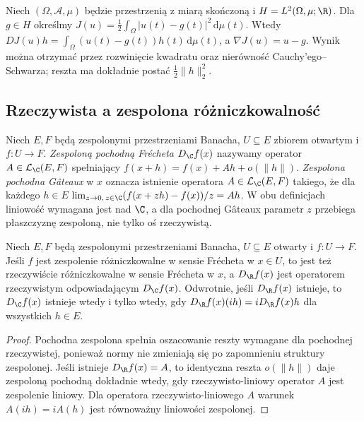 \begin{przyklad}
\label{ex:integral-functional14}
Niech $(\Omega,\mathcal A,\mu)$ będzie przestrzenią z miarą skończoną i $H=L^2(\Omega,\mu;\R)$. Dla $g\in H$ określmy $J(u)=\frac12\int_\Omega |u(t)-g(t)|^2\,\mathrm d\mu(t)$. Wtedy
$DJ(u)h=\int_\Omega (u(t)-g(t))h(t)\,\mathrm d\mu(t)$,
a $\nabla J(u)=u-g$. Wynik można otrzymać przez rozwinięcie kwadratu oraz nierówność Cauchy'ego--Schwarza; reszta ma dokładnie postać $\frac12\|h\|_2^2$.
\end{przyklad}

\subsection{Rzeczywista a zespolona różniczkowalność}

\begin{definicja}
\label{def:complex-differentiability14}
Niech $E,F$ będą zespolonymi przestrzeniami Banacha, $U\subseteq E$ zbiorem otwartym i $f:U\to F$. \emph{Zespoloną pochodną Frécheta} $D_{\C}f(x)$ nazywamy operator $A\in\mathcal L_{\C}(E,F)$ spełniający $f(x+h)=f(x)+Ah+o(\|h\|)$. \emph{Zespolona pochodna Gâteaux} w $x$ oznacza istnienie operatora $A\in\mathcal L_{\C}(E,F)$ takiego, że dla każdego $h\in E$
$\lim_{z\to0,\,z\in\C}(f(x+zh)-f(x))/z=Ah$.
W obu definicjach liniowość wymagana jest nad $\C$, a dla pochodnej Gâteaux parametr $z$ przebiega płaszczyznę zespoloną, nie tylko oś rzeczywistą.
\end{definicja}

\begin{stwierdzenie}
\label{prop:complex-real14}
Niech $E,F$ będą zespolonymi przestrzeniami Banacha, $U\subseteq E$ otwarty i $f:U\to F$. Jeśli $f$ jest zespolenie różniczkowalne w sensie Frécheta w $x\in U$, to jest też rzeczywiście różniczkowalne w sensie Frécheta w $x$, a $D_{\R}f(x)$ jest operatorem rzeczywistym odpowiadającym $D_{\C}f(x)$. Odwrotnie, jeśli $D_{\R}f(x)$ istnieje, to $D_{\C}f(x)$ istnieje wtedy i tylko wtedy, gdy $D_{\R}f(x)(ih)=iD_{\R}f(x)h$ dla wszystkich $h\in E$.
\end{stwierdzenie}
\begin{proof}
Pochodna zespolona spełnia oszacowanie reszty wymagane dla pochodnej rzeczywistej, ponieważ normy nie zmieniają się po zapomnieniu struktury zespolonej. Jeśli istnieje $D_{\R}f(x)=A$, to identyczna reszta $o(\|h\|)$ daje zespoloną pochodną dokładnie wtedy, gdy rzeczywisto-liniowy operator $A$ jest zespolenie liniowy. Dla operatora rzeczywisto-liniowego $A$ warunek $A(ih)=iA(h)$ jest równoważny liniowości zespolonej.
\end{proof}

